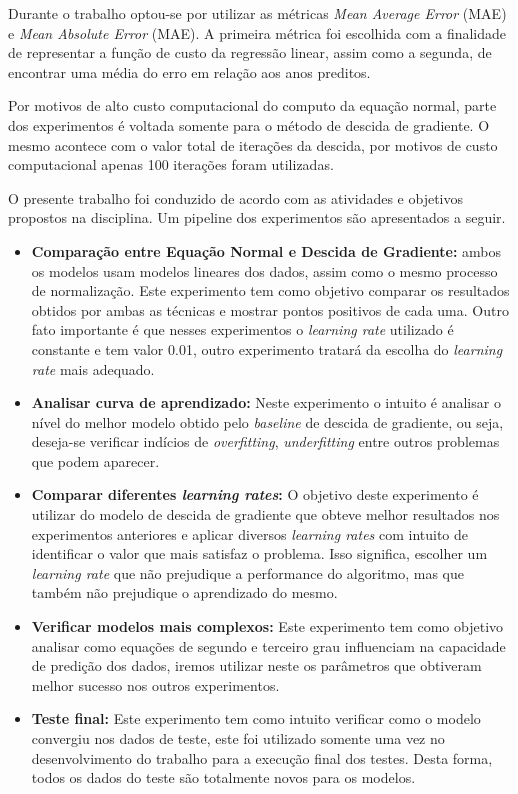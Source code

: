 \documentclass[conference]{IEEEtran}
\begin{document}

Durante o trabalho optou-se por utilizar as métricas \emph{Mean Average Error} (MAE) e \emph{Mean Absolute Error} (MAE). A primeira métrica foi escolhida com a finalidade de representar a função de custo da regressão linear, assim como a segunda, de encontrar uma média do erro em relação aos anos preditos.

Por motivos de alto custo computacional do computo da equação normal, parte dos experimentos é voltada somente para o método de descida de gradiente. O mesmo acontece com o valor total de iterações da descida, por motivos de custo computacional apenas 100 iterações foram utilizadas.

O presente trabalho foi conduzido de acordo com as atividades e objetivos propostos na disciplina. Um pipeline dos experimentos são apresentados a seguir.

\begin{itemize}
	\item \textbf{Comparação entre Equação Normal e Descida de Gradiente: } ambos os modelos usam modelos lineares dos dados, assim como o mesmo processo de normalização. Este experimento tem como objetivo comparar os resultados obtidos por ambas as técnicas e mostrar pontos positivos de cada uma. Outro fato importante é que nesses experimentos o \emph{learning rate} utilizado é constante e tem valor 0.01, outro experimento tratará da escolha do \emph{learning rate} mais adequado.
	\item \textbf{Analisar curva de aprendizado: } Neste experimento o intuito é analisar o nível do melhor modelo obtido pelo \emph{baseline} de descida de gradiente, ou seja, deseja-se verificar indícios de \emph{overfitting}, \emph{underfitting} entre outros problemas que podem aparecer.
	\item \textbf{Comparar diferentes \emph{learning rates}: } O objetivo deste experimento é utilizar do modelo de descida de gradiente que obteve melhor resultados nos experimentos anteriores e aplicar diversos \emph{learning rates} com intuito de identificar o valor que mais satisfaz o problema. Isso significa, escolher um \emph{learning rate} que não prejudique a performance do algoritmo, mas que também não prejudique o aprendizado do mesmo.
	\item \textbf{Verificar modelos mais complexos: } Este experimento tem como objetivo analisar como equações de segundo e terceiro grau influenciam na capacidade de predição dos dados, iremos utilizar neste os parâmetros que obtiveram melhor sucesso nos outros experimentos.
	\item \textbf{Teste final: } Este experimento tem como intuito verificar como o modelo convergiu nos dados de teste, este foi utilizado somente uma vez no desenvolvimento do trabalho para a execução final dos testes. Desta forma, todos os dados do teste são totalmente novos para os modelos.
\end{itemize}
\end{document}
